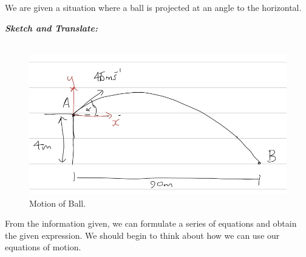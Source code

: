\begin{subquestions}
	
\subquestion
We are given a situation where a ball is projected at an angle to the horizontal.

\begin{subsubquestions}
	
\subsubquestion

\textbf{\textit{Sketch and Translate:}} \\ \\
\begin{figure}[H]
	\begin{center}
		\includegraphics[scale=0.25]{../2014/figures/2014q6-2}
		\caption{\label{2014:q6:Sketch2} Motion of Ball.}
	\end{center}
\end{figure}
From the information given, we can formulate a series of equations and obtain the given expression. We should begin to think about how we can use our equations of motion.





\end{subsubquestions}
\end{subquestions}
